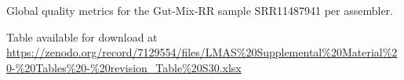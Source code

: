 \begin{table}[]
\centering
\caption{Global quality metrics  for the Gut-Mix-RR sample SRR11487941 per assembler.}
\label{tab:ch5_suptable30}
Table available for download at \url{https://zenodo.org/record/7129554/files/LMAS\%20Supplemental\%20Material\%20-\%20Tables\%20-\%20revision_Table\%20S30.xlsx}
\end{table}